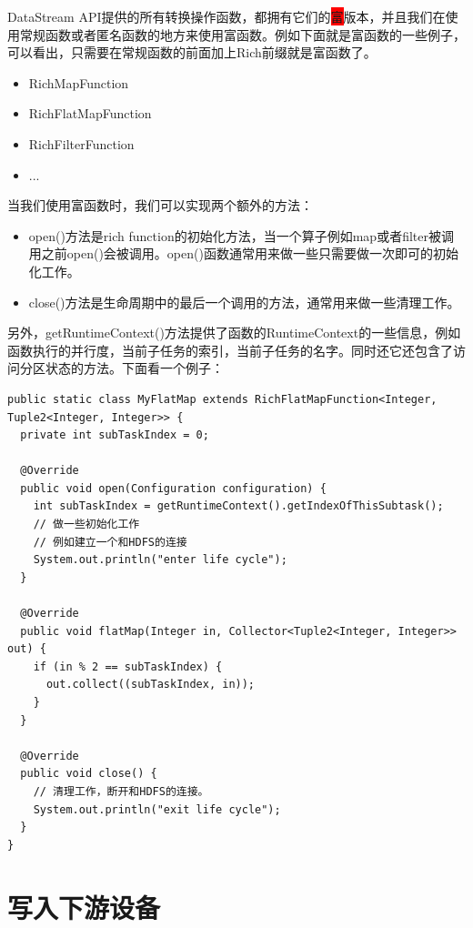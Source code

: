 \documentclass[cn,11pt,chinese]{elegantbook}
\begin{document}
DataStream API提供的所有转换操作函数，都拥有它们的\colorbox{red}{富}版本，并且我们在使用常规函数或者匿名函数的地方来使用富函数。例如下面就是富函数的一些例子，可以看出，只需要在常规函数的前面加上Rich前缀就是富函数了。

\begin{itemize}
    \item RichMapFunction
    \item RichFlatMapFunction
    \item RichFilterFunction
    \item ...
\end{itemize}

当我们使用富函数时，我们可以实现两个额外的方法：

\begin{itemize}
    \item open()方法是rich function的初始化方法，当一个算子例如map或者filter被调用之前open()会被调用。open()函数通常用来做一些只需要做一次即可的初始化工作。
    \item close()方法是生命周期中的最后一个调用的方法，通常用来做一些清理工作。
\end{itemize}

另外，getRuntimeContext()方法提供了函数的RuntimeContext的一些信息，例如函数执行的并行度，当前子任务的索引，当前子任务的名字。同时还它还包含了访问分区状态的方法。下面看一个例子：

\begin{verbatim}
public static class MyFlatMap extends RichFlatMapFunction<Integer, Tuple2<Integer, Integer>> {
  private int subTaskIndex = 0;

  @Override
  public void open(Configuration configuration) {
    int subTaskIndex = getRuntimeContext().getIndexOfThisSubtask();
    // 做一些初始化工作
    // 例如建立一个和HDFS的连接
    System.out.println("enter life cycle");
  }

  @Override
  public void flatMap(Integer in, Collector<Tuple2<Integer, Integer>> out) {
    if (in % 2 == subTaskIndex) {
      out.collect((subTaskIndex, in));
    }
  }

  @Override
  public void close() {
    // 清理工作，断开和HDFS的连接。
    System.out.println("exit life cycle");
  }
}
\end{verbatim}

\section{写入下游设备}
\end{document}
